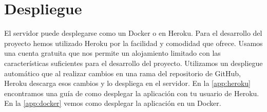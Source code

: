 \section{Despliegue}
\label{makereference4.6}
El servidor puede desplegarse como un Docker o en Heroku.
Para el desarrollo del proyecto hemos utilizado Heroku por la facilidad y
comodidad que ofrece. 
Usamos una cuenta gratuita que nos permite un alojamiento limitado con las
 características suficientes para el desarrollo del proyecto.
Utilizamos un despliegue automático que al realizar cambios en una rama del
 repositorio de GitHub, Heroku descarga esos cambios y lo despliega en el servidor.
En la \autoref{app:heroku} encontramos una guía de como desplegar la
aplicación con tu usuario de Heroku. En la \autoref{app:docker} vemos como
desplegar la aplicación en un Docker.

